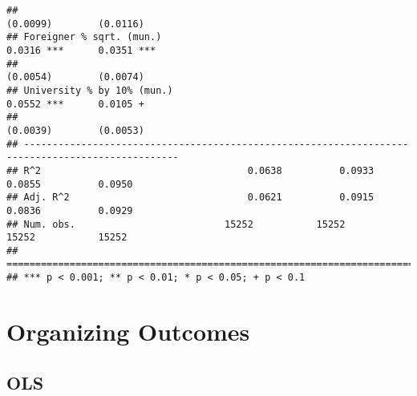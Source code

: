 \documentclass[
]{article}
\newenvironment{Shaded}{\begin{snugshade}}{\end{snugshade}}
\newcommand{\CharTok}[1]{\textcolor[rgb]{0.31,0.60,0.02}{#1}}
\newcommand{\DataTypeTok}[1]{\textcolor[rgb]{0.13,0.29,0.53}{#1}}
\newcommand{\DecValTok}[1]{\textcolor[rgb]{0.00,0.00,0.81}{#1}}
\newcommand{\KeywordTok}[1]{\textcolor[rgb]{0.13,0.29,0.53}{\textbf{#1}}}
\newcommand{\NormalTok}[1]{#1}
\newcommand{\OperatorTok}[1]{\textcolor[rgb]{0.81,0.36,0.00}{\textbf{#1}}}
\newcommand{\StringTok}[1]{\textcolor[rgb]{0.31,0.60,0.02}{#1}}
\begin{document}
\begin{verbatim}
##                                                                       (0.0099)        (0.0116)   
## Foreigner % sqrt. (mun.)                                               0.0316 ***      0.0351 ***
##                                                                       (0.0054)        (0.0074)   
## University % by 10% (mun.)                                             0.0552 ***      0.0105 +  
##                                                                       (0.0039)        (0.0053)   
## -------------------------------------------------------------------------------------------------
## R^2                                    0.0638          0.0933          0.0855          0.0950    
## Adj. R^2                               0.0621          0.0915          0.0836          0.0929    
## Num. obs.                          15252           15252           15252           15252         
## =================================================================================================
## *** p < 0.001; ** p < 0.01; * p < 0.05; + p < 0.1
\end{verbatim}

\hypertarget{organizing-outcomes}{%
\section{Organizing Outcomes}\label{organizing-outcomes}}

\hypertarget{ols}{%
\subsection{OLS}\label{ols}}

\begin{Shaded}
\end{Shaded}
\end{document}

